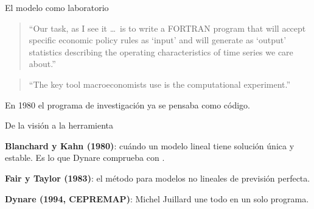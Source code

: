 \begin{frame}[label=laboratorio]{El modelo como laboratorio}
  \begin{quote}
    \enquote{Our task, as I see it \ldots\ is to write a FORTRAN program that will accept
    specific economic policy rules as `input' and will generate as `output' statistics
    describing the operating characteristics of time series we care about.}
  \end{quote}
  \begin{flushright}\small\parencite[pp.~709--710]{lucas1980}\end{flushright}
  \vspace{0.1cm}
  \begin{quote}
    \enquote{The key tool macroeconomists use is the computational experiment.}
  \end{quote}
  \begin{flushright}\small\parencite[p.~341]{kydland2004}\end{flushright}
  \vspace{0.1cm}

  En 1980 el programa de investigación ya se pensaba como código.
\end{frame}

\begin{frame}[label=linea-tiempo]{De la visión a la herramienta}
  \centering
  \par\vspace{0.6cm}
  \raggedright
  \textbf{Blanchard y Kahn (1980)}: cuándo un modelo lineal tiene solución única y
  estable. Es lo que Dynare comprueba con .\par
  \vspace{0.25cm}
  \textbf{Fair y Taylor (1983)}: el método para modelos no lineales de previsión
  perfecta.\par
  \vspace{0.25cm}
  \textbf{Dynare (1994, CEPREMAP)}: Michel Juillard une todo en un solo programa.
\end{frame}

